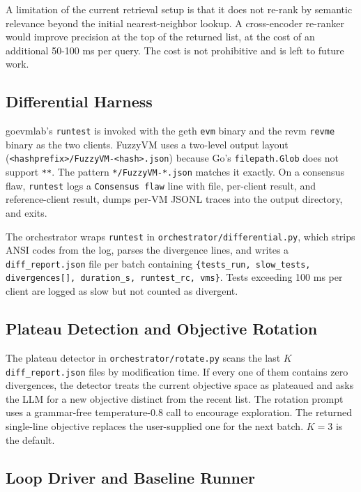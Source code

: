 \documentclass[conference]{IEEEtran}
\begin{document}
A limitation of the current retrieval setup is that it does not re-rank by semantic relevance beyond the initial nearest-neighbor lookup. A cross-encoder re-ranker would improve precision at the top of the returned list, at the cost of an additional 50-100 ms per query. The cost is not prohibitive and is left to future work.

\subsection{Differential Harness}

goevmlab's \texttt{runtest} is invoked with the geth \texttt{evm} binary and the revm \texttt{revme} binary as the two clients. FuzzyVM uses a two-level output layout (\texttt{<hashprefix>/FuzzyVM-<hash>.json}) because Go's \texttt{filepath.Glob} does not support \texttt{**}. The pattern \texttt{*/FuzzyVM-*.json} matches it exactly. On a consensus flaw, \texttt{runtest} logs a \texttt{Consensus flaw} line with file, per-client result, and reference-client result, dumps per-VM JSONL traces into the output directory, and exits.

The orchestrator wraps \texttt{runtest} in \texttt{orchestrator/differential.py}, which strips ANSI codes from the log, parses the divergence lines, and writes a \texttt{diff\_report.json} file per batch containing \texttt{\{tests\_run, slow\_tests, divergences[], duration\_s, runtest\_rc, vms\}}. Tests exceeding 100 ms per client are logged as slow but not counted as divergent.

\subsection{Plateau Detection and Objective Rotation}

The plateau detector in \texttt{orchestrator/rotate.py} scans the last $K$ \texttt{diff\_report.json} files by modification time. If every one of them contains zero divergences, the detector treats the current objective space as plateaued and asks the LLM for a new objective distinct from the recent list. The rotation prompt uses a grammar-free temperature-0.8 call to encourage exploration. The returned single-line objective replaces the user-supplied one for the next batch. $K=3$ is the default.

\subsection{Loop Driver and Baseline Runner}
\end{document}
